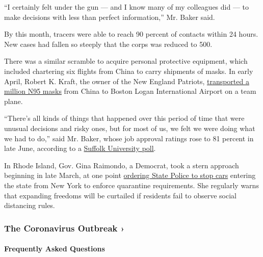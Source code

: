``I certainly felt under the gun --- and I know many of my colleagues
did --- to make decisions with less than perfect information,'' Mr.
Baker said.

By this month, tracers were able to reach 90 percent of contacts within
24 hours. New cases had fallen so steeply that the corps was reduced to
500.

There was a similar scramble to acquire personal protective equipment,
which included chartering six flights from China to carry shipments of
masks. In early April, Robert K. Kraft, the owner of the New England
Patriots,
\href{https://www.bostonglobe.com/2020/04/02/nation/kraft-family-used-patriots-team-plane-shuttle-protective-masks-china-boston-wsj-reports/}{transported
a million N95 masks} from China to Boston Logan International Airport on
a team plane.

``There's all kinds of things that happened over this period of time
that were unusual decisions and risky ones, but for most of us, we felt
we were doing what we had to do,'' said Mr. Baker, whose job approval
ratings rose to 81 percent in late June, according to a
\href{https://www.suffolk.edu/news-features/news/2020/06/24/11/14/poll-4-out-of-5-bay-staters-say-police-dont-treat-blacks-equally}{Suffolk
University poll}.

In Rhode Island, Gov. Gina Raimondo, a Democrat, took a stern approach
beginning in late March, at one point
\href{https://www.nytimes.com/2020/03/28/us/coronavirus-rhode-island-checkpoint.html}{ordering
State Police to stop cars} entering the state from New York to enforce
quarantine requirements. She regularly warns that expanding freedoms
will be curtailed if residents fail to observe social distancing rules.

\href{https://www.nytimes.com/news-event/coronavirus?action=click\&pgtype=Article\&state=default\&region=MAIN_CONTENT_3\&context=storylines_faq}{}

\hypertarget{the-coronavirus-outbreak-}{%
\subsubsection{The Coronavirus Outbreak
›}\label{the-coronavirus-outbreak-}}

\hypertarget{frequently-asked-questions}{%
\paragraph{Frequently Asked
Questions}\label{frequently-asked-questions}}

